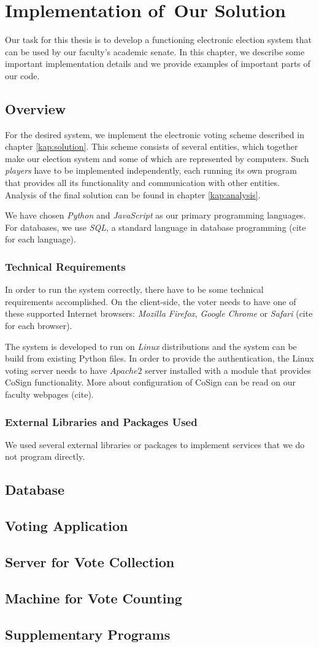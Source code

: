\chapter{Implementation of~Our Solution}
\label{kap:implementation}
Our task for this thesis is to develop a functioning electronic election system that can be used by our faculty's academic senate. In this chapter, we describe some important implementation details and we provide examples of important parts of our code.

\section{Overview}
For the desired system, we implement the electronic voting scheme described in chapter \ref{kap:solution}. This scheme consists of several entities, which together make our election system and some of which are represented by computers. Such \emph{players} have to be implemented independently, each running its own program that provides all its functionality and communication with other entities. Analysis of the final solution can be found in chapter \ref{kap:analysis}.

We have chosen \emph{Python} and \emph{JavaScript} as our primary programming languages. For databases, we use \emph{SQL}, a standard language in database programming (cite for each language).

\subsection{Technical Requirements}
In order to run the system correctly, there have to be some technical requirements accomplished. On the client-side, the voter needs to have one of these supported Internet browsers: \emph{Mozilla Firefox}, \emph{Google Chrome} or \emph{Safari} (cite for each browser).

The system is developed to run on \emph{Linux} distributions and the system can be build from existing Python files. In order to provide the authentication, the Linux voting server needs to have $Apache 2$ server installed with a module that provides CoSign functionality. More about configuration of CoSign can be read on our faculty webpages (cite).

\subsection{External Libraries and Packages Used} 
We used several external libraries or packages to implement services that we do not program directly.
\section{Database}
\section{Voting Application}
\section{Server for Vote Collection}
\section{Machine for Vote Counting}
\section{Supplementary Programs}